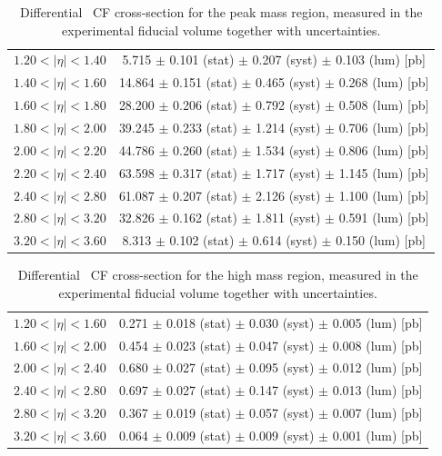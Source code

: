 \begin{table}
\centering
\begin{tabular}{lc}
\hline
$1.20 < |\eta| <1.40$          & 5.715 $\pm$ 0.101 (stat) $\pm$ 0.207 (syst) $\pm$ 0.103 (lum) [pb]  \\
$1.40 < |\eta| <1.60$          & 14.864 $\pm$ 0.151 (stat) $\pm$ 0.465 (syst) $\pm$ 0.268 (lum) [pb]  \\
$1.60 < |\eta| <1.80$          & 28.200 $\pm$ 0.206 (stat) $\pm$ 0.792 (syst) $\pm$ 0.508 (lum) [pb]  \\
$1.80 < |\eta| <2.00$          & 39.245 $\pm$ 0.233 (stat) $\pm$ 1.214 (syst) $\pm$ 0.706 (lum) [pb]  \\
$2.00 < |\eta| <2.20$          & 44.786 $\pm$ 0.260 (stat) $\pm$ 1.534 (syst) $\pm$ 0.806 (lum) [pb]  \\
$2.20 < |\eta| <2.40$          & 63.598 $\pm$ 0.317 (stat) $\pm$ 1.717 (syst) $\pm$ 1.145 (lum) [pb]  \\
$2.40 < |\eta| <2.80$          & 61.087 $\pm$ 0.207 (stat) $\pm$ 2.126 (syst) $\pm$ 1.100 (lum) [pb]  \\
$2.80 < |\eta| <3.20$          & 32.826 $\pm$ 0.162 (stat) $\pm$ 1.811 (syst) $\pm$ 0.591 (lum) [pb]  \\
$3.20 < |\eta| <3.60$          & 8.313 $\pm$ 0.102 (stat) $\pm$ 0.614 (syst) $\pm$ 0.150 (lum) [pb]  \\
\hline
\end{tabular}
\caption{Differential \Zee\ CF cross-section for the peak mass region, measured in the experimental fiducial volume together with uncertainties.}
\label{tab:Zee_peak}
\end{table}

\begin{table}
\centering
\begin{tabular}{lc}
\hline
$1.20 < |\eta| <1.60$          & 0.271 $\pm$ 0.018 (stat) $\pm$ 0.030 (syst) $\pm$ 0.005 (lum) [pb]  \\
$1.60 < |\eta| <2.00$          & 0.454 $\pm$ 0.023 (stat) $\pm$ 0.047 (syst) $\pm$ 0.008 (lum) [pb]  \\
$2.00 < |\eta| <2.40$          & 0.680 $\pm$ 0.027 (stat) $\pm$ 0.095 (syst) $\pm$ 0.012 (lum) [pb]  \\
$2.40 < |\eta| <2.80$          & 0.697 $\pm$ 0.027 (stat) $\pm$ 0.147 (syst) $\pm$ 0.013 (lum) [pb]  \\
$2.80 < |\eta| <3.20$          & 0.367 $\pm$ 0.019 (stat) $\pm$ 0.057 (syst) $\pm$ 0.007 (lum) [pb]  \\
$3.20 < |\eta| <3.60$          & 0.064 $\pm$ 0.009 (stat) $\pm$ 0.009 (syst) $\pm$ 0.001 (lum) [pb]  \\
\hline
\end{tabular}
\caption{Differential \Zee\ CF cross-section for the high mass region, measured in the experimental fiducial volume together with uncertainties.}
\label{tab:Zee_high}
\end{table}
